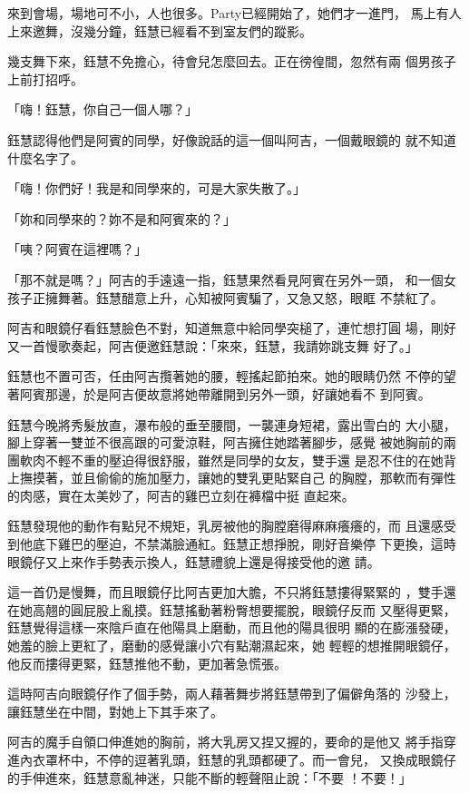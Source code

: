 來到會場，場地可不小，人也很多。Party已經開始了，她們才一進門，
馬上有人上來邀舞，沒幾分鐘，鈺慧已經看不到室友們的蹤影。

幾支舞下來，鈺慧不免擔心，待會兒怎麼回去。正在徬徨間，忽然有兩
個男孩子上前打招呼。

「嗨！鈺慧，你自己一個人哪？」

鈺慧認得他們是阿賓的同學，好像說話的這一個叫阿吉，一個戴眼鏡的
就不知道什麼名字了。

「嗨！你們好！我是和同學來的，可是大家失散了。」

「妳和同學來的？妳不是和阿賓來的？」

「咦？阿賓在這裡嗎？」

「那不就是嗎？」阿吉的手遠遠一指，鈺慧果然看見阿賓在另外一頭，
和一個女孩子正擁舞著。鈺慧醋意上升，心知被阿賓騙了，又急又怒，眼眶
不禁紅了。

阿吉和眼鏡仔看鈺慧臉色不對，知道無意中給同學突槌了，連忙想打圓
場，剛好又一首慢歌奏起，阿吉便邀鈺慧說：「來來，鈺慧，我請妳跳支舞
好了。」

鈺慧也不置可否，任由阿吉攬著她的腰，輕搖起節拍來。她的眼睛仍然
不停的望著阿賓那邊，於是阿吉便故意將她帶離開到另外一頭，好讓她看不
到阿賓。

鈺慧今晚將秀髮放直，瀑布般的垂至腰間，一襲連身短裙，露出雪白的
大小腿，腳上穿著一雙並不很高跟的可愛涼鞋，阿吉擁住她踏著腳步，感覺
被她胸前的兩團軟肉不輕不重的壓迫得很舒服，雖然是同學的女友，雙手還
是忍不住的在她背上撫摸著，並且偷偷的施加壓力，讓她的雙乳更貼緊自己
的胸膛，那軟而有彈性的肉感，實在太美妙了，阿吉的雞巴立刻在褲檔中挺
直起來。

鈺慧發現他的動作有點兒不規矩，乳房被他的胸膛磨得麻麻癢癢的，而
且還感受到他底下雞巴的壓迫，不禁滿臉通紅。鈺慧正想掙脫，剛好音樂停
下更換，這時眼鏡仔又上來作手勢表示換人，鈺慧禮貌上還是得接受他的邀
請。

這一首仍是慢舞，而且眼鏡仔比阿吉更加大膽，不只將鈺慧摟得緊緊的
，雙手還在她高翹的圓屁股上亂摸。鈺慧搖動著粉臀想要擺脫，眼鏡仔反而
又壓得更緊，鈺慧覺得這樣一來陰戶直在他陽具上磨動，而且他的陽具很明
顯的在膨漲發硬，她羞的臉上更紅了，磨動的感覺讓小穴有點潮濕起來，她
輕輕的想推開眼鏡仔，他反而摟得更緊，鈺慧推他不動，更加著急慌張。

這時阿吉向眼鏡仔作了個手勢，兩人藉著舞步將鈺慧帶到了偏僻角落的
沙發上，讓鈺慧坐在中間，對她上下其手來了。

阿吉的魔手自領口伸進她的胸前，將大乳房又捏又握的，要命的是他又
將手指穿進內衣罩杯中，不停的逗著乳頭，鈺慧的乳頭都硬了。而一會兒，
又換成眼鏡仔的手伸進來，鈺慧意亂神迷，只能不斷的輕聲阻止說：「不要
！不要！」


